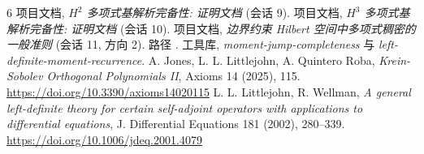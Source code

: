 \documentclass[UTF8]{ctexart}
\begin{document}
\begin{thebibliography}{6}
 项目文档, \emph{$H^2$ 多项式基解析完备性: 证明文档} (会话 9).
 项目文档, \emph{$H^3$ 多项式基解析完备性: 证明文档} (会话 10).
 项目文档, \emph{边界约束 Hilbert 空间中多项式稠密的一般准则} (会话 11, 方向 2).
	路径 .
 工具库, \emph{moment-jump-completeness} 与 \emph{left-definite-moment-recurrence}.
 A. Jones, L. L. Littlejohn, A. Quintero Roba, \emph{Krein-Sobolev
	Orthogonal Polynomials II}, Axioms 14 (2025), 115.
	\url{https://doi.org/10.3390/axioms14020115}
 L. L. Littlejohn, R. Wellman, \emph{A general left-definite theory
	for certain self-adjoint operators with applications to differential equations},
	J. Differential Equations 181 (2002), 280--339.
	\url{https://doi.org/10.1006/jdeq.2001.4079}
\end{thebibliography}
\end{document}
